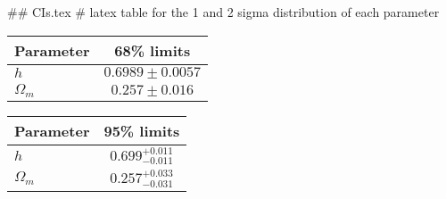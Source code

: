 ## CIs.tex
# latex table for the 1 and 2 sigma distribution of each parameter

\begin{tabular} { l  c}
 Parameter &  68\% limits\\
\hline
{\boldmath$h              $} & $0.6989\pm 0.0057          $\\
{\boldmath$\Omega_m       $} & $0.257\pm 0.016            $\\
\hline
\end{tabular}

\begin{tabular} { l  c}
 Parameter &  95\% limits\\
\hline
{\boldmath$h              $} & $0.699^{+0.011}_{-0.011}   $\\
{\boldmath$\Omega_m       $} & $0.257^{+0.033}_{-0.031}   $\\
\hline
\end{tabular}
